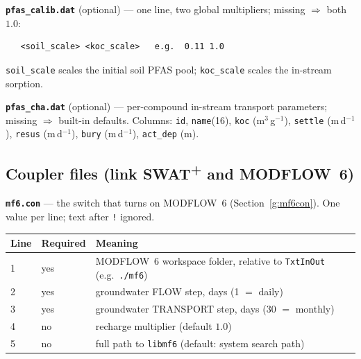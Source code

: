 \documentclass[12pt]{article}
\begin{document}
\textbf{\texttt{pfas\_calib.dat}} (optional) --- one line, two global multipliers;
missing $\Rightarrow$ both $1.0$:
\begin{verbatim}
   <soil_scale> <koc_scale>   e.g.  0.11 1.0
\end{verbatim}
\texttt{soil\_scale} scales the initial soil PFAS pool; \texttt{koc\_scale} scales
the in-stream sorption.

\textbf{\texttt{pfas\_cha.dat}} (optional) --- per-compound in-stream transport
parameters; missing $\Rightarrow$ built-in defaults. Columns: \texttt{id},
\texttt{name}(16), \texttt{koc} (m$^3$\,g$^{-1}$), \texttt{settle} (m\,d$^{-1}$),
\texttt{resus} (m\,d$^{-1}$), \texttt{bury} (m\,d$^{-1}$), \texttt{act\_dep} (m).

\subsection{Coupler files (link SWAT\textsuperscript{+} and MODFLOW~6)}
\textbf{\texttt{mf6.con}} --- the switch that turns on MODFLOW~6 (Section~\ref{g:mf6con}).
One value per line; text after \texttt{!} ignored.
\begin{table}[ht]\centering\small
\begin{tabularx}{\textwidth}{llX}
\toprule
Line & Required & Meaning \\ \midrule
1 & yes & MODFLOW~6 workspace folder, relative to \texttt{TxtInOut} (e.g.\ \texttt{./mf6}) \\
2 & yes & groundwater FLOW step, days (1 $=$ daily) \\
3 & yes & groundwater TRANSPORT step, days (30 $=$ monthly) \\
4 & no  & recharge multiplier (default $1.0$) \\
5 & no  & full path to \texttt{libmf6} (default: system search path) \\
\bottomrule
\end{tabularx}
\end{table}
\end{document}
